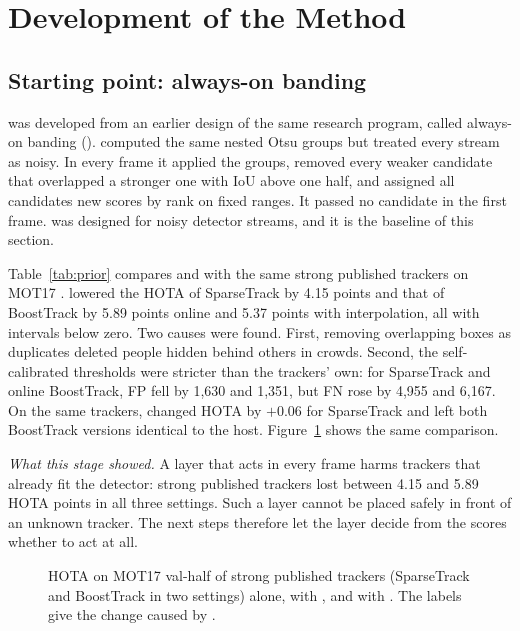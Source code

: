 \section{Development of the Method}\label{sec:development}

\subsection{Starting point: always-on banding}\label{sec:prior}
\scl{} was developed from an earlier design of the same research program,
called always-on banding (\aob{}). \aob{} computed the same nested Otsu
groups but treated every stream as noisy. In every frame it applied the
groups, removed every weaker candidate that overlapped a stronger one with
IoU above one half, and assigned all candidates new scores by rank on fixed
ranges. It passed no candidate in the first frame. \aob{} was designed for
noisy detector streams, and it is the baseline of this section.

Table~\ref{tab:prior} compares \aob{} and \scl{} with the same strong
published trackers on MOT17 \cite{milan2016mot16}. \aob{} lowered the HOTA of
SparseTrack by 4.15 points and that of BoostTrack by 5.89 points online and
5.37 points with interpolation, all with intervals below zero. Two causes
were found. First, removing overlapping boxes as duplicates deleted people
hidden behind others in crowds. Second, the self-calibrated thresholds were
stricter than the trackers' own: for SparseTrack and online BoostTrack, FP
fell by 1,630 and 1,351, but FN rose by 4,955 and 6,167. On the same trackers, \scl{} changed HOTA by $+0.06$ for SparseTrack
and left both BoostTrack versions identical to the host.
Figure~\ref{fig:prior} shows the same comparison.

\emph{What this stage showed.} A layer that acts in every frame harms
trackers that already fit the detector: strong published trackers lost
between 4.15 and 5.89 HOTA points in all three settings. Such a layer cannot
be placed safely in front of an unknown tracker. The next steps therefore let
the layer decide from the scores whether to act at all.



\begin{figure}[t]
\centering

\caption{HOTA on MOT17 val-half of strong published trackers (SparseTrack and
BoostTrack in two settings) alone, with \aob{}, and with \scl{}. The labels
give the change caused by \aob{}.}
\label{fig:prior}
\end{figure}

